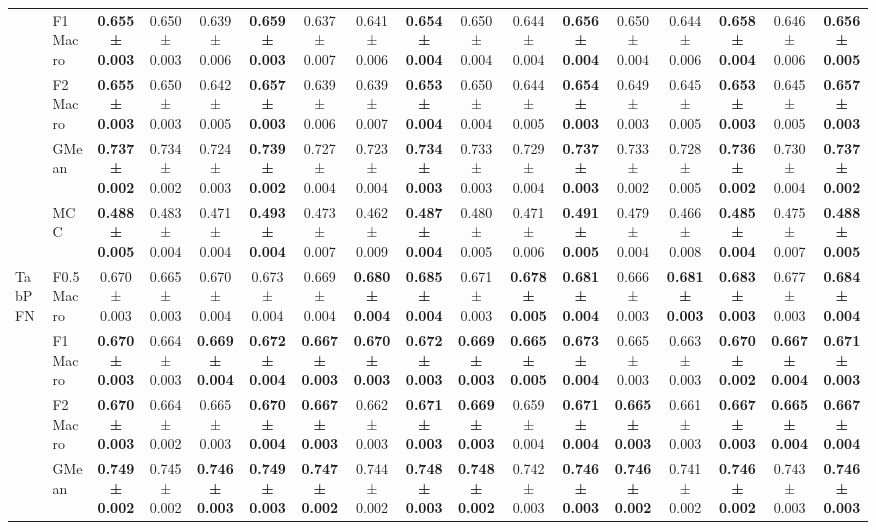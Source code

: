 \begin{table}[H]
{\begin{tabular}{llccccccccccccccc}
 & F1 Macro & \textbf{0.655 ± 0.003} & 0.650 ± 0.003 & 0.639 ± 0.006 & \textbf{0.659 ± 0.003} & 0.637 ± 0.007 & 0.641 ± 0.006 & \textbf{0.654 ± 0.004} & 0.650 ± 0.004 & 0.644 ± 0.004 & \textbf{0.656 ± 0.004} & 0.650 ± 0.004 & 0.644 ± 0.006 & \textbf{0.658 ± 0.004} & 0.646 ± 0.006 & \textbf{0.656 ± 0.005} \\
 & F2 Macro & \textbf{0.655 ± 0.003} & 0.650 ± 0.003 & 0.642 ± 0.005 & \textbf{0.657 ± 0.003} & 0.639 ± 0.006 & 0.639 ± 0.007 & \textbf{0.653 ± 0.004} & 0.650 ± 0.004 & 0.644 ± 0.005 & \textbf{0.654 ± 0.003} & 0.649 ± 0.003 & 0.645 ± 0.005 & \textbf{0.653 ± 0.003} & 0.645 ± 0.005 & \textbf{0.657 ± 0.003} \\
 & GMean & \textbf{0.737 ± 0.002} & 0.734 ± 0.002 & 0.724 ± 0.003 & \textbf{0.739 ± 0.002} & 0.727 ± 0.004 & 0.723 ± 0.004 & \textbf{0.734 ± 0.003} & 0.733 ± 0.003 & 0.729 ± 0.004 & \textbf{0.737 ± 0.003} & 0.733 ± 0.002 & 0.728 ± 0.005 & \textbf{0.736 ± 0.002} & 0.730 ± 0.004 & \textbf{0.737 ± 0.002} \\
 & MCC & \textbf{0.488 ± 0.005} & 0.483 ± 0.004 & 0.471 ± 0.004 & \textbf{0.493 ± 0.004} & 0.473 ± 0.007 & 0.462 ± 0.009 & \textbf{0.487 ± 0.004} & 0.480 ± 0.005 & 0.471 ± 0.006 & \textbf{0.491 ± 0.005} & 0.479 ± 0.004 & 0.466 ± 0.008 & \textbf{0.485 ± 0.004} & 0.475 ± 0.007 & \textbf{0.488 ± 0.005} \\
\cline{1-17}
\multirow[t]{5}{*}{TabPFN} & F0.5 Macro & 0.670 ± 0.003 & 0.665 ± 0.003 & 0.670 ± 0.004 & 0.673 ± 0.004 & 0.669 ± 0.004 & \textbf{0.680 ± 0.004} & \textbf{0.685 ± 0.004} & 0.671 ± 0.003 & \textbf{0.678 ± 0.005} & \textbf{0.681 ± 0.004} & 0.666 ± 0.003 & \textbf{0.681 ± 0.003} & \textbf{0.683 ± 0.003} & 0.677 ± 0.003 & \textbf{0.684 ± 0.004} \\
 & F1 Macro & \textbf{0.670 ± 0.003} & 0.664 ± 0.003 & \textbf{0.669 ± 0.004} & \textbf{0.672 ± 0.004} & \textbf{0.667 ± 0.003} & \textbf{0.670 ± 0.003} & \textbf{0.672 ± 0.003} & \textbf{0.669 ± 0.003} & \textbf{0.665 ± 0.005} & \textbf{0.673 ± 0.004} & 0.665 ± 0.003 & 0.663 ± 0.003 & \textbf{0.670 ± 0.002} & \textbf{0.667 ± 0.004} & \textbf{0.671 ± 0.003} \\
 & F2 Macro & \textbf{0.670 ± 0.003} & 0.664 ± 0.002 & 0.665 ± 0.003 & \textbf{0.670 ± 0.004} & \textbf{0.667 ± 0.003} & 0.662 ± 0.003 & \textbf{0.671 ± 0.003} & \textbf{0.669 ± 0.003} & 0.659 ± 0.004 & \textbf{0.671 ± 0.004} & \textbf{0.665 ± 0.003} & 0.661 ± 0.003 & \textbf{0.667 ± 0.003} & \textbf{0.665 ± 0.004} & \textbf{0.667 ± 0.004} \\
 & GMean & \textbf{0.749 ± 0.002} & 0.745 ± 0.002 & \textbf{0.746 ± 0.003} & \textbf{0.749 ± 0.003} & \textbf{0.747 ± 0.002} & 0.744 ± 0.002 & \textbf{0.748 ± 0.003} & \textbf{0.748 ± 0.002} & 0.742 ± 0.003 & \textbf{0.746 ± 0.003} & \textbf{0.746 ± 0.002} & 0.741 ± 0.002 & \textbf{0.746 ± 0.002} & 0.743 ± 0.003 & \textbf{0.746 ± 0.003} \\

\end{tabular}}
\end{table}
